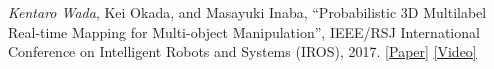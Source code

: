 \documentclass[letterpaper,MMMyyyy,nonstop]{simpleresumecv}
\begin{document}
\begin{body}
\BigGapNoBreak

\textit{Kentaro Wada}, Kei Okada, and Masayuki Inaba,
``Probabilistic 3D Multilabel Real-time Mapping for Multi-object Manipulation'',
IEEE/RSJ International Conference on Intelligent Robots and Systems (IROS), 2017.
\href{https://arxiv.org/abs/2001.05752}{\underline{[Paper]}}
\href{https://youtu.be/T-vtVQT9sgc}{\underline{[Video]}}





\end{body}
\end{document}
